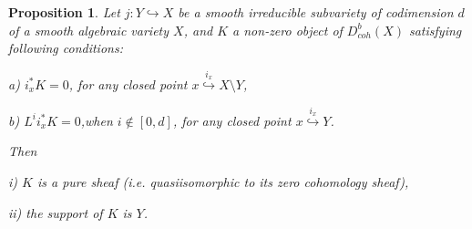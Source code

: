 \documentclass[12pt]{article}
\newtheorem{proposition}[theorem]{Proposition}
\def\db#1{ D^b_{coh}({#1})}
\begin{document}
\begin{proposition}\label{tor}
Let $j: Y\hookrightarrow X$ be a smooth irreducible subvariety of codimension $d$ of a smooth algebraic variety $X$, and $K$ a non-zero object of $\db{X}$ satisfying following conditions:

a) $i^*_x K=0$, \qquad for any closed point $x\stackrel{i_x}{\hookrightarrow} X\setminus Y$, 

b) $L^i i^*_x K=0$,\qquad when $ i\notin [0, d]$, for any closed point $x\stackrel{i_x}{\hookrightarrow} Y$. 

Then

i) $K$ is a pure sheaf (i.e. quasiisomorphic to its zero cohomology sheaf),

ii) the support of $K$ is $Y$.
\end{proposition}
\end{document}
